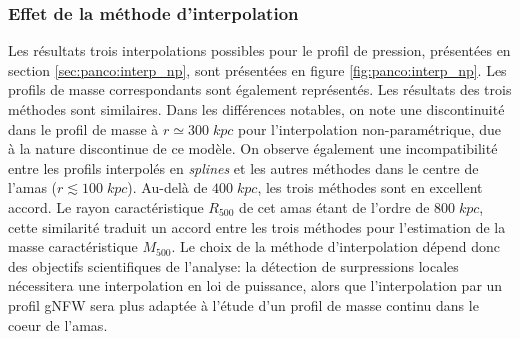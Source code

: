 \subsubsection{Effet de la méthode d'interpolation} %
\label{sec:panco:interp_np_results}
Les résultats trois interpolations possibles pour le profil de pression, présentées en section \ref{sec:panco:interp_np}, sont présentées en figure \ref{fig:panco:interp_np}.
Les profils de masse correspondants sont également représentés.
Les résultats des trois méthodes sont similaires.
Dans les différences notables, on note une discontinuité dans le profil de masse à $r \simeq 300 \;\unit{kpc}$ pour l'interpolation non-paramétrique, due à la nature discontinue de ce modèle.
On observe également une incompatibilité entre les profils interpolés en \textit{splines} et les autres méthodes dans le centre de l'amas ($r \lesssim 100 \;\unit{kpc}$).
Au-delà de $400 \;\unit{kpc}$, les trois méthodes sont en excellent accord.
Le rayon caractéristique $R_{500}$ de cet amas étant de l'ordre de $800 \;\unit{kpc}$, cette similarité traduit un accord entre les trois méthodes pour l'estimation de la masse caractéristique $M_{500}$.
Le choix de la méthode d'interpolation dépend donc des objectifs scientifiques de l'analyse: la détection de surpressions locales nécessitera une interpolation en loi de puissance, alors que l'interpolation par un profil gNFW sera plus adaptée à l'étude d'un profil de masse continu dans le coeur de l'amas.

